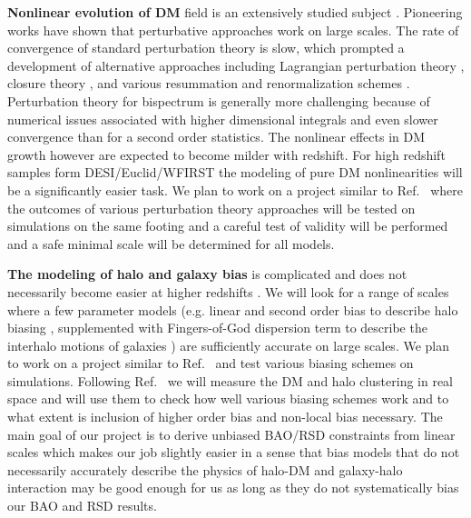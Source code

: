 \textbf{Nonlinear evolution of DM} field is an extensively studied subject
\cite{1981MNRAS.197..931J,1983MNRAS.203..345V,1986ApJ...311....6G,1992PhRvD..46..585M,1994ApJ...431..495J}.
Pioneering works have shown that perturbative approaches work on large scales.
The rate of convergence of standard perturbation theory is slow, which
prompted a development of alternative approaches including Lagrangian
perturbation theory
\cite{1992MNRAS.254..729B,1993MNRAS.264..375B,1994MNRAS.267..811B,1995A&A...296..575B},
closure theory
\cite{2007PhRvD..75d3514M,2008ApJ...674..617T,2008JCAP...10..036P}, and various
resummation and renormalization schemes
\cite{2006PhRvD..73f3519C,2006PhRvD..73f3520C,2008PhRvD..77b3533C}.
Perturbation theory for bispectrum is generally more challenging because of
numerical issues associated with higher dimensional integrals and even slower
convergence than for a second order statistics. The nonlinear effects in DM
growth however are expected to become milder with redshift. For high redshift
samples form DESI/Euclid/WFIRST the modeling of pure DM nonlinearities will be
a significantly easier task. We plan to work on a project similar to
Ref.~\cite{2009PhRvD..80d3531C} where the outcomes of various perturbation
theory approaches will be tested on simulations on the same footing and a
careful test of validity will be performed and a safe minimal scale will be
determined for all models.

\textbf{The modeling of halo and galaxy bias} is complicated and does not
necessarily become easier at higher redshifts \cite{2018PhR...733....1D}. We
will look for a range of scales where a few parameter models (e.g.  linear and
second order bias to describe halo biasing
\cite{1993ApJ...413..447F,2012PhRvD..85h3509C,2012PhRvD..86h3540B}, supplemented
with Fingers-of-God dispersion term to describe the interhalo motions of
galaxies \cite{1972MNRAS.156P...1J,2005ApJ...630....1Z,2016MNRAS.455L..77H})
are sufficiently accurate on large scales. We plan to work on a
project similar to Ref.~\cite{2009ApJ...691..569J} and test various biasing
schemes on simulations.  Following Ref.~\cite{2009ApJ...691..569J} we will
measure the DM and halo clustering in real space and will use them to check how
well various biasing schemes work and to what extent is inclusion of higher
order bias and non-local bias necessary. The main goal of our project is to
derive unbiased BAO/RSD constraints from linear scales which makes our job
slightly easier in a sense that bias models that do not necessarily accurately
describe the physics of halo-DM and galaxy-halo interaction may be good enough
for us as long as they do not systematically bias our BAO and RSD results.

